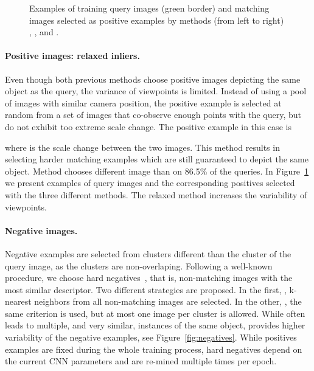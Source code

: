 \documentclass[runningheads]{llncs}
\begin{document}
\begin{figure}[t]
\begin{tabular}{lclc}
\end{tabular}
\caption{Examples of training query images (green border) and matching images selected as positive examples by methods (from left to right) , , and .
\label{fig:positives}}
\end{figure}
 

\paragraph{Positive images: relaxed inliers.}
Even though both previous methods choose positive images depicting the same object as the query, the variance of viewpoints is limited.
Instead of using a pool of images with similar camera position, the positive example is selected at random from a set of images that co-observe enough points with the query, but do not exhibit too extreme scale change. 
The positive example in this case is  
 
where  is the scale change between the two images.
This method results in selecting harder matching examples which are still guaranteed to depict the same object. Method  chooses different image than  on 86.5\% of the queries.
In Figure~\ref{fig:positives} we present examples of query images and the corresponding positives selected with the three different methods. The relaxed method increases the variability of viewpoints. 


\paragraph{Negative images.} 
Negative examples are selected from clusters different than the cluster of the query image, as the clusters are non-overlaping. 
Following a well-known procedure, we choose hard negatives~\cite{STFKM14,GDDM14}, that is, non-matching images with the most similar descriptor. Two different strategies are proposed. In the first, , k-nearest neighbors from all non-matching images are selected. In the other, , the same criterion is used, but at most one image per cluster is allowed. While  often leads to multiple, and very similar, instances of the same object,  provides higher variability of the negative examples, see Figure~\ref{fig:negatives}. While positives examples are fixed during the whole training process, hard negatives depend on the current CNN parameters and are re-mined multiple times per epoch. 

\setlength{\fboxsep}{0pt}\setlength{\fboxrule}{2pt}
\end{document}
